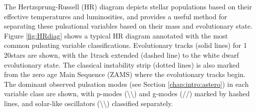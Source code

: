 The Hertzsprung-Russell (HR) diagram depicts stellar populations based on their effective temperatures and luminosities, and provides a useful method for separating these pulsational variables based on their mass and evolutionary state. Figure \ref{fig:HRdiag} shows a typical HR diagram annotated with the most common pulsating variable classifications. Evolutionary tracks (solid lines) for 1\Msol \textendash{} 20\Msol stars are shown, with the 1\Msol track extended (dashed line) to the white dwarf evolutionary state. The classical instability strip (dotted lines) is also marked from the zero age Main Sequence (ZAMS) where the evolutionary tracks begin. The dominant observed pulsation modes (see Section \ref{chap:intro:astero}) in each variable class are shown, with p-modes (\textbackslash\textbackslash) and g-modes (//) marked by hashed lines, and solar-like oscillators (\textbackslash\textbackslash) classified separately. %

